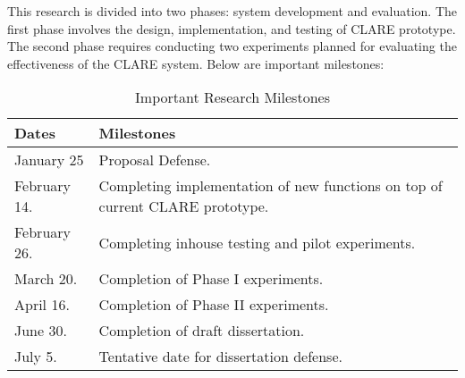 This research is divided into two phases: system development and
evaluation.  The first phase involves the design, implementation, and
testing of CLARE prototype. The second phase requires conducting two 
experiments planned for evaluating the effectiveness of the CLARE
system. Below are important milestones:

\begin{table}[ht]
  \begin{center}
    \begin{tabular} {|p{1.5in}|p{4.0in}|} \hline   
      {\bf Dates } & {\bf Milestones}\\ \hline

      January 25 & Proposal Defense. \\ \hline
      
      February 14. & Completing implementation of new functions on top of
      current CLARE prototype. \\ \hline
      
      February 26. & Completing inhouse testing and pilot experiments. \\
      \hline
      
      March 20. & Completion of Phase I experiments. \\ \hline
      
      April 16. & Completion of Phase II experiments. \\ \hline
      
      June 30.  & Completion of draft dissertation. \\ \hline July 5.  &
      Tentative date for dissertation defense. \\ \hline
    \end{tabular}
    \caption{Important Research Milestones}
    \label{tab:milestones}
  \end{center}
\end{table}

